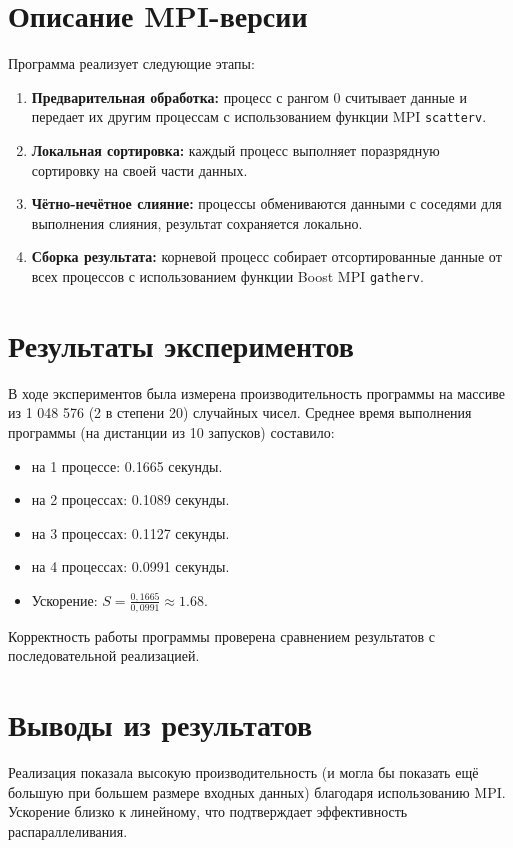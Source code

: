 ﻿\documentclass[a4paper,12pt]{article}
\begin{document}
\section*{Описание MPI-версии}
Программа реализует следующие этапы:
\begin{enumerate}
    \item \textbf{Предварительная обработка:} процесс с рангом 0 считывает данные и передает их другим процессам с использованием функции MPI \texttt{scatterv}.
    \item \textbf{Локальная сортировка:} каждый процесс выполняет поразрядную сортировку на своей части данных.
    \item \textbf{Чётно-нечётное слияние:} процессы обмениваются данными с соседями для выполнения слияния, результат сохраняется локально.
    \item \textbf{Сборка результата:} корневой процесс собирает отсортированные данные от всех процессов с использованием функции Boost MPI \texttt{gatherv}.
\end{enumerate}

\section*{Результаты экспериментов}
В ходе экспериментов была измерена производительность программы на массиве из 1 048 576 (2 в степени 20) случайных чисел. Среднее время выполнения программы (на дистанции из 10 запусков) составило:
\begin{itemize}
    \item на 1 процессе: 0.1665 секунды.
    \item на 2 процессах: 0.1089 секунды.
    \item на 3 процессах: 0.1127 секунды.
    \item на 4 процессах: 0.0991 секунды.
    \item Ускорение: $S = \frac{0,1665}{0,0991} \approx 1.68$.
\end{itemize}

Корректность работы программы проверена сравнением результатов с последовательной реализацией.

\section*{Выводы из результатов}
Реализация показала высокую производительность (и могла бы показать ещё большую при большем размере входных данных) благодаря использованию MPI. Ускорение близко к линейному, что подтверждает эффективность распараллеливания.
\end{document}

